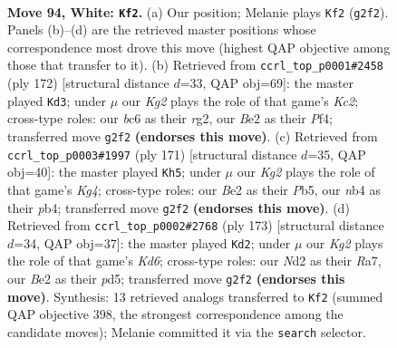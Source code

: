 \documentclass[11pt]{article}
\begin{document}
\clearpage

\begin{figure}[p]\centering
\begin{subfigure}{0.46\textwidth}\centering
\resizebox{\linewidth}{!}{%
\newchessgame
\chessboard[
  setfen={5r2/4kp2/2b3p1/4P3/1n3Ppp/8/3NB1KP/8 w - - 2 94},
  showmover=false,
  pgfstyle=straightmove, color=movearrow, markmove={g2-f2}
]}
\caption{}
\end{subfigure}\hfill
\begin{subfigure}{0.46\textwidth}\centering
\resizebox{\linewidth}{!}{%
\newchessgame
\chessboard[
  setfen={3B4/7p/p3B1pP/2k2p2/2Pp1P2/8/2K3r1/8 w - - 2 87},
  showmover=false,
  pgfstyle=straightmove, color=movearrow, markmove={c2-d3}
]}
\caption{}
\end{subfigure}
\\[4pt]
\begin{subfigure}{0.46\textwidth}\centering
\resizebox{\linewidth}{!}{%
\newchessgame
\chessboard[
  setfen={8/4B3/8/1p4k1/1P3p1p/1b3P1P/1P3KP1/8 b - - 43 86},
  showmover=false,
  pgfstyle=straightmove, color=movearrow, markmove={g5-h5}
]}
\caption{}
\end{subfigure}\hfill
\begin{subfigure}{0.46\textwidth}\centering
\resizebox{\linewidth}{!}{%
\newchessgame
\chessboard[
  setfen={8/r7/3p4/3Pp2p/1R2P2P/3k4/5K2/3b1B2 b - - 72 87},
  showmover=false,
  pgfstyle=straightmove, color=movearrow, markmove={d3-d2}
]}
\caption{}
\end{subfigure}
\caption{\textbf{Move 94, White: \texttt{Kf2}.} (a) Our position; Melanie plays \texttt{Kf2} (\texttt{g2f2}). Panels (b)--(d) are the retrieved master positions whose correspondence most drove this move (highest QAP objective among those that transfer to it). (b) Retrieved from \texttt{ccrl\_top\_p0001\#2458} (ply 172) [structural distance $d$=33, QAP obj=69]: the master played \texttt{Kd3}; under $\mu$ our \emph{Kg2} plays the role of that game's \emph{Kc2}; cross-type roles: our \emph{b}c6 as their \emph{r}g2, our \emph{B}e2 as their \emph{P}f4; transferred move \texttt{g2f2} \textbf{(endorses this move)}. (c) Retrieved from \texttt{ccrl\_top\_p0003\#1997} (ply 171) [structural distance $d$=35, QAP obj=40]: the master played \texttt{Kh5}; under $\mu$ our \emph{Kg2} plays the role of that game's \emph{Kg4}; cross-type roles: our \emph{B}e2 as their \emph{P}b5, our \emph{n}b4 as their \emph{p}b4; transferred move \texttt{g2f2} \textbf{(endorses this move)}. (d) Retrieved from \texttt{ccrl\_top\_p0002\#2768} (ply 173) [structural distance $d$=34, QAP obj=37]: the master played \texttt{Kd2}; under $\mu$ our \emph{Kg2} plays the role of that game's \emph{Kd6}; cross-type roles: our \emph{N}d2 as their \emph{R}a7, our \emph{B}e2 as their \emph{p}d5; transferred move \texttt{g2f2} \textbf{(endorses this move)}. Synthesis: 13 retrieved analogs transferred to \texttt{Kf2} (summed QAP objective 398, the strongest correspondence among the candidate moves); Melanie committed it via the \texttt{search} selector.}
\label{fig:thought-m186}
\end{figure}
\end{document}
